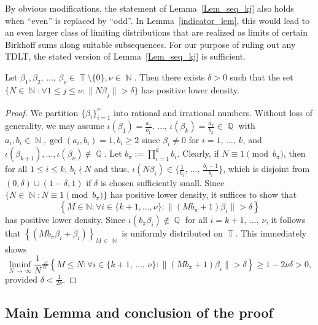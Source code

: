 \documentclass[AHL,Unicode,longabstracts,published]{cedram}
\DeclareMathOperator{\N}{\mathbb{N}}
\DeclareMathOperator{\Q}{\mathbb{Q}}
\DeclareMathOperator{\T}{\mathbb{T}}
\newcommand{\bbN}{\mathbb{N}}
\let\oldforall\forall
\renewcommand*{\forall}{\mathrel{\oldforall}}
\begin{document}
\begin{rema}\label{Rem_evenoddIndices}
By obvious modifications, the statement of Lemma~\ref{Lem_seq_kj} also holds when ``even'' is replaced by ``odd''. In Lemma~\ref{indicator_lem}, this would lead to an even larger class of limiting distributions that are realized as limits of certain Birkhoff sums along suitable subsequences. For our purpose of ruling out any TDLT, the stated version of Lemma~\ref{Lem_seq_kj} is sufficient.
\end{rema}



\begin{prop}\label{isolated_density}
Let $\beta_1,\beta_2,\,\ldots,\,\beta_{\nu} \in \T \setminus \{0\}, \nu \in \N$. Then there exists $\delta> 0$ such that the set $\{N \in \N: \forall 1 \leq j \leq \nu: \| N\beta_j \| > \delta \}$ has positive lower density.
\end{prop}

\begin{proof}
We partition $\{ \beta_i \}_{i=1}^{\nu} $ into rational and irrational numbers. Without loss of generality, we may assume $\iota(\beta_1) = \frac{a_1}{b_1},\,\ldots,\,\iota(\beta_k) = \frac{a_k}{b_k} \in \Q$ with $a_i,b_i \in \N, \gcd(a_i,b_i) = 1, b_i \geq 2$ since $\beta_i \neq 0$ for $i = 1,\,\ldots,\,k$, and $\iota(\beta_{k+1}),\ldots,\iota(\beta_{\nu}) \notin \Q$. Let $b_{\pi} := \prod_{i=1}^{k}b_i$. Clearly, if $N \equiv 1 \pmod {b_{\pi}}$, then for all $1 \leq i \leq k$, $b_i \nmid N$ and thus, $\iota(N\beta_i) \in \{\frac{1}{b_i},\,\ldots,\,\tfrac{b_i-1}{b_i}\}$, which is disjoint from $(0,\delta) \cup (1-\delta,1)$ if $\delta$ is chosen sufficiently small. Since $\{N \in \N: N \equiv 1 \pmod{b_{\pi}}\}$ has positive lower density, it suffices to show that
\begin{equation*}
\left\{M \in \bbN: \forall i \in \{k+1,\ldots,\nu\}:
\| (M b_{\pi}+1)\beta_i \| > \delta \right\}
\end{equation*}
has positive lower density. Since $ \iota (b_{\pi} \beta_i) \notin \Q$ for all $i=k+1,\,\ldots,\,\nu$, it follows that $ \left \{ (M b_{\pi} \beta_i + \beta_i)\right\}_{M\,\in\,\N}$ is uniformly distributed on $\T$. This immediately shows
\[
\liminf_{N\,\to\,\infty}
\frac{1}{N}\#\left\{M \leq N: \forall i \in \{k+1,\,\ldots,\,\nu\}:
\| (M b_{\pi}+1)\beta_i \| > \delta \right\}
\geq 1 - 2\nu\delta > 0,
\]
provided $\delta < \frac{1}{2\nu}$.
\end{proof}

\subsection{Main Lemma and conclusion of the proof}\label{SubSec_proofThm}
\end{document}
